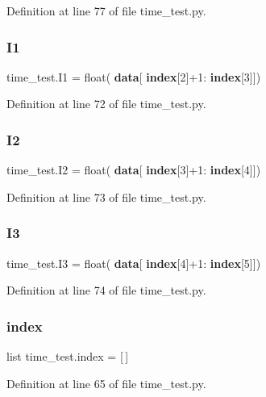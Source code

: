 Definition at line 77 of file time\+\_\+test.\+py.

\mbox{\label{namespacetime__test_a9582c3eb5bd550969b7a42fe3ea9d945}} 
\subsubsection{I1}
{\footnotesize\ttfamily time\+\_\+test.\+I1 = float(\textbf{ data}[\textbf{ index}[2]+1\+:\textbf{ index}[3]])}



Definition at line 72 of file time\+\_\+test.\+py.

\mbox{\label{namespacetime__test_af9082b004ae17a752ef1995d3d308f2d}} 
\subsubsection{I2}
{\footnotesize\ttfamily time\+\_\+test.\+I2 = float(\textbf{ data}[\textbf{ index}[3]+1\+:\textbf{ index}[4]])}



Definition at line 73 of file time\+\_\+test.\+py.

\mbox{\label{namespacetime__test_ab51e4b8c88d7bd03db045d513d3af86f}} 
\subsubsection{I3}
{\footnotesize\ttfamily time\+\_\+test.\+I3 = float(\textbf{ data}[\textbf{ index}[4]+1\+:\textbf{ index}[5]])}



Definition at line 74 of file time\+\_\+test.\+py.

\mbox{\label{namespacetime__test_a11cd401a60efd2279c058ff3d5d516df}} 
\subsubsection{index}
{\footnotesize\ttfamily list time\+\_\+test.\+index = [$\,$]}



Definition at line 65 of file time\+\_\+test.\+py.

\mbox{\label{namespacetime__test_a000e0228ba0c6dc1c3ed75a36462ea69}} 
